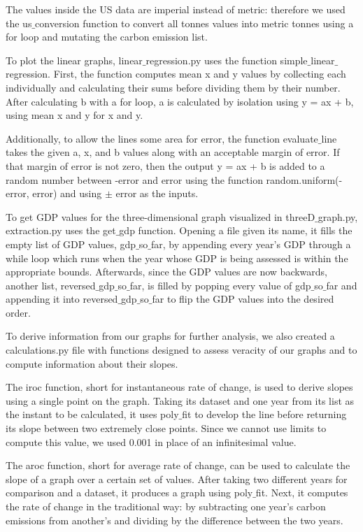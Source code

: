 \documentclass[fontsize=11pt]{article}
\begin{document}
    The values inside the US data are imperial instead of metric: therefore we used the us$\_$conversion function to convert all tonnes values into metric tonnes using a for loop and mutating the carbon emission list.

    To plot the linear graphs, linear$\_$regression.py uses the function simple$\_$linear$\_$regression. First, the function computes mean x and y values by collecting each individually and calculating their sums before dividing them by their number. After calculating b with a for loop, a is calculated by isolation using y = ax + b, using mean x and y for x and y.

    Additionally, to allow the lines some area for error, the function evaluate$\_$line takes the given a, x, and b values along with an acceptable margin of error. If that margin of error is not zero, then the output y = ax + b is added to a random number between -error and error using the function random.uniform(-error, error) and using $\pm$ error as the inputs.

    To get GDP values for the three-dimensional graph visualized in threeD$\_$graph.py, extraction.py uses the get$\_$gdp function. Opening a file given its name, it fills the empty list of GDP values, gdp$\_$so$\_$far, by appending every year's GDP through a while loop which runs when the year whose GDP is being assessed is within the appropriate bounds. Afterwards, since the GDP values are now backwards, another list, reversed$\_$gdp$\_$so$\_$far, is filled by popping every value of gdp$\_$so$\_$far and appending it into reversed$\_$gdp$\_$so$\_$far to flip the GDP values into the desired order.

    To derive information from our graphs for further analysis, we also created a calculations.py file with functions designed to assess veracity of our graphs and to compute information about their slopes.

    The iroc function, short for instantaneous rate of change, is used to derive slopes using a single point on the graph. Taking its dataset and one year from its list as the instant to be calculated, it uses poly$\_$fit to develop the line before returning its slope between two extremely close points. Since we cannot use limits to compute this value, we used 0.001 in place of an infinitesimal value.

    The aroc function, short for average rate of change, can be used to calculate the slope of a graph over a certain set of values. After taking two different years for comparison and a dataset, it produces a graph using poly$\_$fit. Next, it computes the rate of change in the traditional way: by subtracting one year's carbon emissions from another's and dividing by the difference between the two years.
\end{document}

